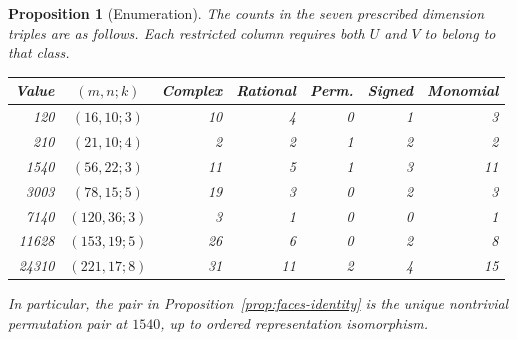 \documentclass[11pt,a4paper]{article}
\newtheorem{proposition}{Proposition}[section]
\begin{document}
\begin{proposition}[Enumeration]\label{t:counts}
The counts in the seven prescribed dimension triples are as follows. Each restricted column requires both $U$ and $V$ to belong to that class.
\begin{center}\small
\begin{tabular}{rcrrrrr}
\toprule
Value&$(m,n;k)$&Complex&Rational&Perm.&Signed&Monomial\\\midrule
120&$(16,10;3)$&10&4&0&1&3\\
210&$(21,10;4)$&2&2&1&2&2\\
1540&$(56,22;3)$&11&5&1&3&11\\
3003&$(78,15;5)$&19&3&0&2&3\\
7140&$(120,36;3)$&3&1&0&0&1\\
11628&$(153,19;5)$&26&6&0&2&8\\
24310&$(221,17;8)$&31&11&2&4&15\\\bottomrule
\end{tabular}\end{center}
In particular, the pair in Proposition~\ref{prop:faces-identity} is the unique nontrivial permutation pair at $1540$, up to ordered representation isomorphism.
\end{proposition}
\end{document}
